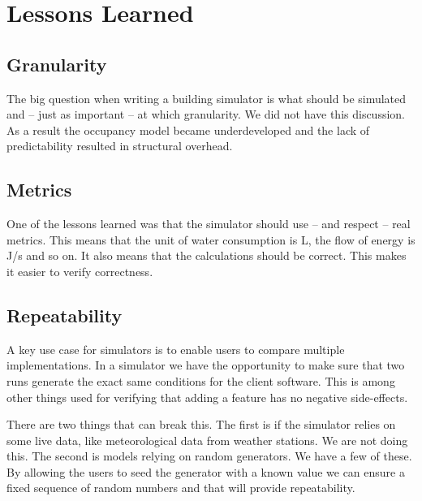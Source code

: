 \documentclass[10pt]{article}
\begin{document}

\section{Lessons Learned}
\label{sec:lessons}

\subsection{Granularity}

The big question when writing a building simulator is what should be simulated and -- just as important -- at which granularity. We did not have this discussion. As a result the occupancy model became underdeveloped and the lack of predictability resulted in structural overhead.

\subsection{Metrics}

One of the lessons learned was that the simulator should use -- and respect -- real metrics. This means that the unit of water consumption is L, the flow of energy is J/s and so on. It also means that the calculations should be correct. This makes it easier to verify correctness.

\subsection{Repeatability}

A key use case for simulators is to enable users to compare multiple implementations. In a simulator we have the opportunity to make sure that two runs generate the exact same conditions for the client software. This is among other things used for verifying that adding a feature has no negative side-effects.

There are two things that can break this. The first is if the simulator relies on some live data, like meteorological data from weather stations. We are not doing this. The second is models relying on random generators. We have a few of these. By allowing the users to seed the generator with a known value we can ensure a fixed sequence of random numbers and that will provide repeatability.
\end{document}
